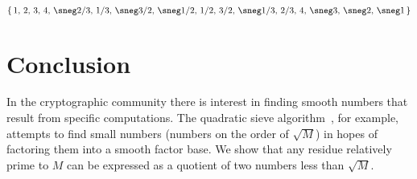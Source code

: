 \documentclass[submission,copyright,creativecommons]{eptcs}
\begin{document}
\[
\{
\,1,\,2,\,3,\,4,\,\sneg2/3,\,1/3,\,\sneg3/2,\,\sneg1/2,\,1/2,\,3/2,\,\sneg1/3,\,2/3,\,4,\,\sneg3,\,\sneg2,\,\sneg1\,
\}
\]

\section{Conclusion}

In the cryptographic community there is interest in finding smooth
numbers that result from specific computations.  The quadratic sieve
algorithm~\cite{Sieve}, for example, attempts to find small numbers (numbers on the
order of $\sqrt{M}$) in hopes of factoring them into a smooth factor
base.  We show that any residue relatively prime to $M$ can be
expressed as a quotient of two numbers less than $\sqrt{M}$.

{}

\end{document}
